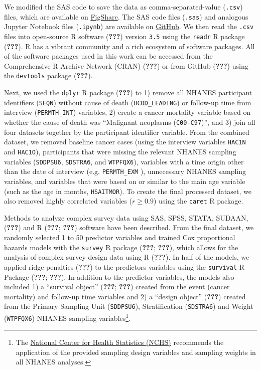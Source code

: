 \documentclass[12pt,twoside]{reedthesis}
\theoremstyle{definition}
\theoremstyle{definition}
\theoremstyle{definition}
\theoremstyle{remark}
\begin{document}
We modified the SAS code to save the data as comma-separated-value
(\texttt{.csv}) files, which are available on
\href{https://figshare.com/articles/adult_csv/6210263}{FigShare}. The
SAS code files (\texttt{.sas}) and analogous Jupyter Notebook files
(\texttt{.ipynb}) are available on
\href{https://github.com/marskar/nhanes}{GitHub}. We then read the
\texttt{.csv} files into open-source R software ({\textbf{???}}) version
\texttt{3.5} using the \texttt{readr} R package ({\textbf{???}}). R has
a vibrant community and a rich ecosystem of software packages. All of
the software packages used in this work can be accessed from the
Comprehensive R Archive Network (CRAN) ({\textbf{???}}) or from GitHub
({\textbf{???}}) using the \texttt{devtools} package ({\textbf{???}}).

Next, we used the \texttt{dplyr} R package ({\textbf{???}}) to 1) remove
all NHANES participant identifiers (\texttt{SEQN}) without cause of
death (\texttt{UCOD\_LEADING}) or follow-up time from interview
(\texttt{PERMTH\_INT}) variables, 2) create a cancer mortality variable
based on whether the cause of death was ``Malignant neoplasms
(\texttt{C00-C97})'', and 3) join all four datasets together by the
participant identifier variable. From the combined dataset, we removed
baseline cancer cases (using the interview variables \texttt{HAC1N} and
\texttt{HAC1O}), participants that were missing the relevant NHANES
sampling variables (\texttt{SDDPSU6}, \texttt{SDSTRA6}, and
\texttt{WTPFQX6}), variables with a time origin other than the date of
interview (e.g. \texttt{PERMTH\_EXM} ), unnecessary NHANES sampling
variables, and variables that were based on or similar to the main age
variable (such as the age in months, \texttt{HSAITMOR}). To create the
final processed dataset, we also removed highly correlated variables
(\(r \geq 0.9\)) using the \texttt{caret} R package.

Methods to analyze complex survey data using SAS, SPSS, STATA, SUDAAN,
({\textbf{???}}) and R ({\textbf{???}}; {\textbf{???}}) software have
been described. From the final dataset, we randomly selected 1 to 50
predictor variables and trained Cox proportional hazards models with the
\texttt{survey} R package ({\textbf{???}}; {\textbf{???}}), which allows
for the analysis of complex survey design data using R ({\textbf{???}}).
In half of the models, we applied ridge penalties ({\textbf{???}}) to
the predictors variables using the \texttt{survival} R Package
({\textbf{???}}; {\textbf{???}}). In addition to the predictor
variables, the models also included 1) a ``survival object''
({\textbf{???}}; {\textbf{???}}) created from the event (cancer
mortality) and follow-up time variables and 2) a ``design object''
({\textbf{???}}) created from the Primary Sampling Unit
(\texttt{SDDPSU6}), Stratification (\texttt{SDSTRA6}) and Weight
(\texttt{WTPFQX6}) NHANES sampling variables\footnote{The
  \href{https://www.cdc.gov/nchs/tutorials/NHANES/SurveyDesign/SampleDesign/intro_iii.htm}{National
  Center for Health Statistics (NCHS)} recommends the application of the
  provided sampling design variables and sampling weights in all NHANES
  analyses.}.
\end{document}
